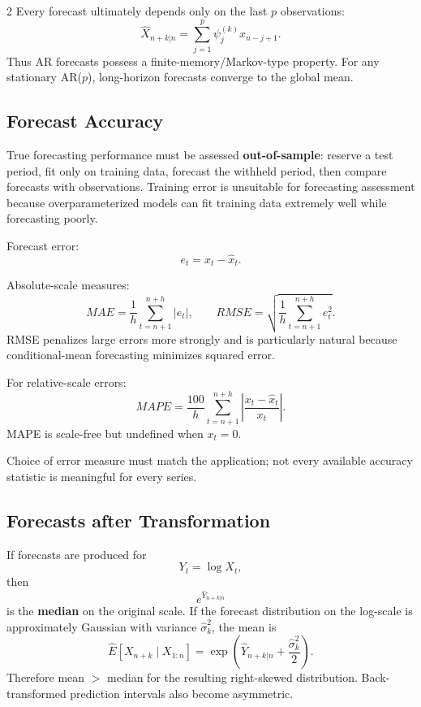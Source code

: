 \documentclass[9pt,a4paper]{extarticle}
\newcommand{\key}[1]{\textbf{#1}}
\begin{document}
\begin{multicols}{2}
Every forecast ultimately depends only on the last \(p\) observations:
\[
\widehat X_{n+k|n}
=\sum_{j=1}^{p}\psi_j^{(k)}x_{n-j+1}.
\]
Thus AR forecasts possess a finite-memory/Markov-type property. For any stationary AR($p$), long-horizon forecasts converge to the global mean.

\subsection{Forecast Accuracy}

True forecasting performance must be assessed \key{out-of-sample}: reserve a test period, fit only on training data, forecast the withheld period, then compare forecasts with observations. Training error is unsuitable for forecasting assessment because overparameterized models can fit training data extremely well while forecasting poorly.

Forecast error:
\[
e_t=x_t-\widehat x_t.
\]

Absolute-scale measures:
\[
\boxed{
MAE=\frac1h\sum_{t=n+1}^{n+h}|e_t|
},\qquad
\boxed{
RMSE=
\sqrt{\frac1h\sum_{t=n+1}^{n+h}e_t^2}.
}
\]
RMSE penalizes large errors more strongly and is particularly natural because conditional-mean forecasting minimizes squared error.

For relative-scale errors:
\[
\boxed{
MAPE=
\frac{100}{h}
\sum_{t=n+1}^{n+h}
\left|
\frac{x_t-\widehat x_t}{x_t}
\right|.
}
\]
MAPE is scale-free but undefined when \(x_t=0\).

Choice of error measure must match the application; not every available accuracy statistic is meaningful for every series.

\subsection{Forecasts after Transformation}

If forecasts are produced for
\[
Y_t=\log X_t,
\]
then
\[
e^{\widehat Y_{n+k|n}}
\]
is the \key{median} on the original scale. If the forecast distribution on the log-scale is approximately Gaussian with variance \(\widehat\sigma_k^2\), the mean is
\[
\boxed{
\widehat E[X_{n+k}\mid X_{1:n}]
=
\exp\!\left(
\widehat Y_{n+k|n}
+\frac{\widehat\sigma_k^2}{2}
\right).
}
\]
Therefore mean \(>\) median for the resulting right-skewed distribution. Back-transformed prediction intervals also become asymmetric.


\end{multicols}
\end{document}
